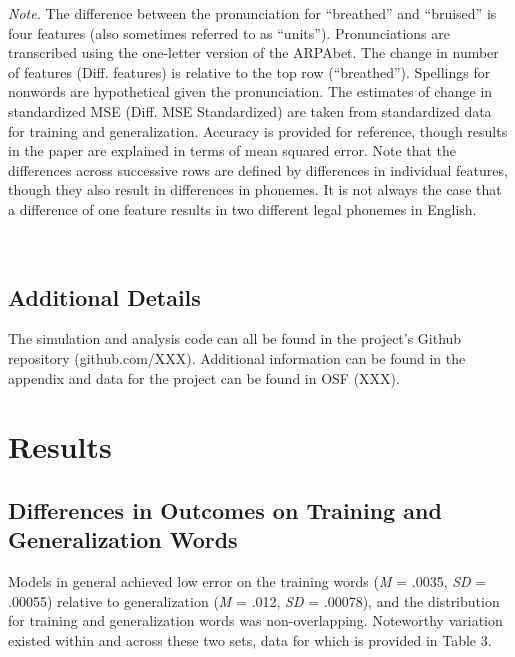 \documentclass[
  ,man,floatsintext]{apa6}
\begin{document}
\emph{Note.} The difference between the pronunciation for ``breathed'' and ``bruised'' is four features (also sometimes referred to as ``units''). Pronunciations are transcribed using the one-letter version of the ARPAbet. The change in number of features (Diff. features) is relative to the top row (``breathed''). Spellings for nonwords are hypothetical given the pronunciation. The estimates of change in standardized MSE (Diff. MSE Standardized) are taken from standardized data for training and generalization. Accuracy is provided for reference, though results in the paper are explained in terms of mean squared error. Note that the differences across successive rows are defined by differences in individual features, though they also result in differences in phonemes. It is not always the case that a difference of one feature results in two different legal phonemes in English.

~

\subsection{Additional Details}\label{additional-details}

The simulation and analysis code can all be found in the project's Github repository (github.com/XXX). Additional information can be found in the appendix and data for the project can be found in OSF (XXX).

\section{Results}\label{results}

\subsection{Differences in Outcomes on Training and Generalization Words}\label{differences-in-outcomes-on-training-and-generalization-words}

Models in general achieved low error on the training words (\emph{M} = .0035, \emph{SD} = .00055) relative to generalization (\emph{M} = .012, \emph{SD} = .00078), and the distribution for training and generalization words was non-overlapping. Noteworthy variation existed within and across these two sets, data for which is provided in Table 3.
\end{document}
